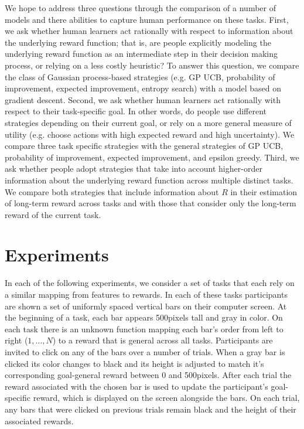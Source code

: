 \documentclass[10pt,letterpaper]{article}
\def\maxheight{500}
\begin{document}
	We hope to address three questions through the comparison of a number of models and there abilities to capture human performance on these tasks. First, we ask whether human learners act rationally with respect to information about the underlying reward function; that is, are people explicitly modeling the underlying reward function as an intermediate step in their decision making process, or relying on a less costly heuristic? To answer this question, we compare the class of Gaussian process-based strategies (e.g. GP UCB, probability of improvement, expected improvement, entropy search) with a model based on gradient descent. Second, we ask whether human learners act rationally with respect to their task-specific goal. In other words, do people use different strategies depending on their current goal, or rely on a more general measure of utility (e.g. choose actions with high expected reward and high uncertainty). We compare three task specific strategies with the general strategies of GP UCB, probability of improvement, expected improvement, and epsilon greedy. Third, we ask whether people adopt strategies that take into account higher-order information about the underlying reward function across multiple distinct tasks. We compare both strategies that include information about $R$ in their estimation of long-term reward across tasks and with those that consider only the long-term reward of the current task.
	
	\section{Experiments}
	
	In each of the following experiments, we consider a set of tasks that each rely on a similar mapping from features to rewards. In each of these tasks participants are shown a set of uniformly spaced vertical bars on their computer screen. At the beginning of a task, each bar appears \maxheight \space pixels tall and gray in color. On each task there is an unknown function mapping each bar's order from left to right ($1,...,N$) to a reward that is general across all tasks. Participants are invited to click on any of the bars over a number of trials. When a gray bar is clicked its color changes to black and its height is adjusted to match it's corresponding goal-general reward between 0 and \maxheight \space pixels. After each trial the reward associated with the chosen bar is used to update the participant's goal-specific reward, which is displayed on the screen alongside the bars. On each trial, any bars that were clicked on previous trials remain black and the height of their associated rewards.
	
\end{document}
